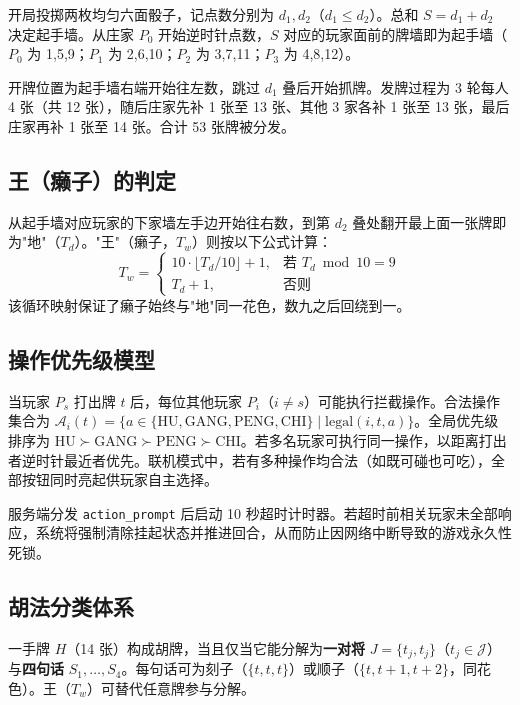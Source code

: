 \documentclass[11pt,a4paper]{article}
\begin{document}
开局投掷两枚均匀六面骰子，记点数分别为 $d_1, d_2$（$d_1 \leq d_2$）。总和 $S = d_1 + d_2$ 决定起手墙。从庄家 $P_0$ 开始逆时针点数，$S$ 对应的玩家面前的牌墙即为起手墙（$P_0$ 为 1,5,9；$P_1$ 为 2,6,10；$P_2$ 为 3,7,11；$P_3$ 为 4,8,12）。

开牌位置为起手墙右端开始往左数，跳过 $d_1$ 叠后开始抓牌。发牌过程为 3 轮每人 4 张（共 12 张），随后庄家先补 1 张至 13 张、其他 3 家各补 1 张至 13 张，最后庄家再补 1 张至 14 张。合计 53 张牌被分发。

\subsection{王（癞子）的判定}

从起手墙对应玩家的下家墙左手边开始往右数，到第 $d_2$ 叠处翻开最上面一张牌即为"地"（$T_d$）。"王"（癞子，$T_w$）则按以下公式计算：
\begin{equation}
  T_w = \begin{cases}
    10\cdot\lfloor T_d/10\rfloor + 1, & \text{若 } T_d \bmod 10 = 9 \\
    T_d + 1, & \text{否则}
  \end{cases}
\end{equation}
该循环映射保证了癞子始终与"地"同一花色，数九之后回绕到一。

\subsection{操作优先级模型}

当玩家 $P_s$ 打出牌 $t$ 后，每位其他玩家 $P_i$（$i \neq s$）可能执行拦截操作。合法操作集合为 $\mathcal{A}_i(t) = \{a \in \{\text{HU}, \text{GANG}, \text{PENG}, \text{CHI}\} \mid \text{legal}(i,t,a)\}$。全局优先级排序为 $\text{HU} \succ \text{GANG} \succ \text{PENG} \succ \text{CHI}$。若多名玩家可执行同一操作，以距离打出者逆时针最近者优先。联机模式中，若有多种操作均合法（如既可碰也可吃），全部按钮同时亮起供玩家自主选择。

服务端分发 \texttt{action\_prompt} 后启动 10 秒超时计时器。若超时前相关玩家未全部响应，系统将强制清除挂起状态并推进回合，从而防止因网络中断导致的游戏永久性死锁。

\subsection{胡法分类体系}

一手牌 $H$（14 张）构成胡牌，当且仅当它能分解为\textbf{一对将} $J = \{t_j, t_j\}$（$t_j \in \mathcal{J}$）与\textbf{四句话} $S_1,\ldots,S_4$。每句话可为刻子（$\{t,t,t\}$）或顺子（$\{t,t+1,t+2\}$，同花色）。王（$T_w$）可替代任意牌参与分解。
\end{document}
